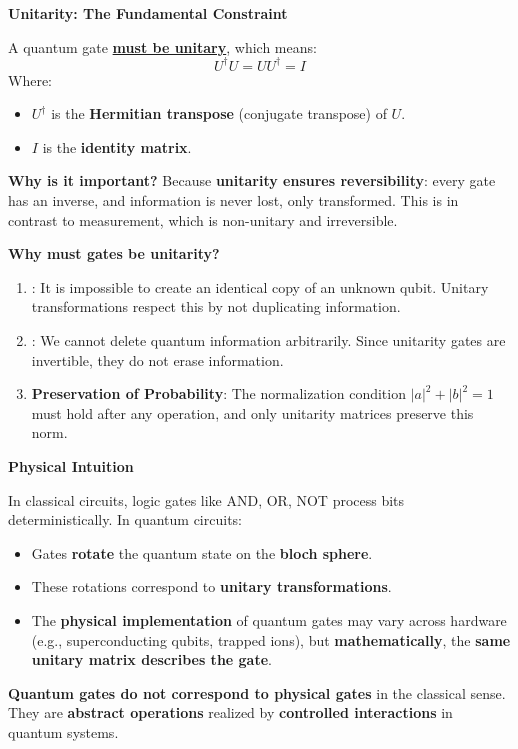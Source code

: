 \highspace
\begin{flushleft}
    \textcolor{Green3}{ \textbf{Unitarity: The Fundamental Constraint}}
\end{flushleft}
A quantum gate \textbf{\underline{must be unitary}}, which means:
\begin{equation}
    U^{\dagger} U = U U^{\dagger} = I
\end{equation}
Where:
\begin{itemize}
    \item $U^{\dagger}$ is the \textbf{Hermitian transpose} (conjugate transpose) of $U$.
    \item $I$ is the \textbf{identity matrix}.
\end{itemize}
\textcolor{Green3}{ \textbf{Why is it important?}} Because \textbf{unitarity ensures reversibility}: every gate has an inverse, and information is never lost, only transformed. This is in contrast to measurement, which is non-unitary and irreversible.

\highspace
\begin{flushleft}
    \textcolor{Red2}{ \textbf{Why must gates be unitarity?}}
\end{flushleft}
\begin{enumerate}
    \item {}: It is impossible to create an identical copy of an unknown qubit. Unitary transformations respect this by not duplicating information.
    \item {}: We cannot delete quantum information arbitrarily. Since unitarity gates are invertible, they do not erase information.
    \item \textbf{Preservation of Probability}: The normalization condition $\left|a\right|^{2} + \left|b\right|^{2} = 1$ must hold after any operation, and only unitarity matrices preserve this norm.
\end{enumerate}

\highspace
\begin{flushleft}
    \textcolor{Green3}{ \textbf{Physical Intuition}}
\end{flushleft}
In classical circuits, logic gates like AND, OR, NOT process bits deterministically. In quantum circuits:
\begin{itemize}
    \item Gates \textbf{rotate} the quantum state on the \textbf{bloch sphere}.
    \item These rotations correspond to \textbf{unitary transformations}.
    \item The \textbf{physical implementation} of quantum gates may vary across hardware (e.g., superconducting qubits, trapped ions), but \textbf{mathematically}, the \textbf{same unitary matrix describes the gate}.
\end{itemize}
\textbf{Quantum gates do not correspond to physical gates} in the classical sense. They are \textbf{abstract operations} realized by \textbf{controlled interactions} in quantum systems.
